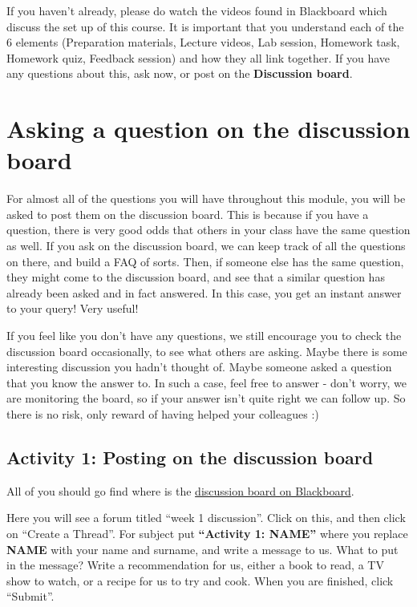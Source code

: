\documentclass[
]{book}
\begin{document}
If you haven't already, please do watch the videos found in Blackboard which discuss the set up of this course. It is important that you understand each of the 6 elements (Preparation materials, Lecture videos, Lab session, Homework task, Homework quiz, Feedback session) and how they all link together. If you have any questions about this, ask now, or post on the \textbf{Discussion board}.

\hypertarget{asking-a-question-on-the-discussion-board}{%
\section{Asking a question on the discussion board}\label{asking-a-question-on-the-discussion-board}}

For almost all of the questions you will have throughout this module, you will be asked to post them on the discussion board. This is because if you have a question, there is very good odds that others in your class have the same question as well. If you ask on the discussion board, we can keep track of all the questions on there, and build a FAQ of sorts. Then, if someone else has the same question, they might come to the discussion board, and see that a similar question has already been asked and in fact answered. In this case, you get an instant answer to your query! Very useful!

If you feel like you don't have any questions, we still encourage you to check the discussion board occasionally, to see what others are asking. Maybe there is some interesting discussion you hadn't thought of. Maybe someone asked a question that you know the answer to. In such a case, feel free to answer - don't worry, we are monitoring the board, so if your answer isn't quite right we can follow up. So there is no risk, only reward of having helped your colleagues :)

\hypertarget{activity-1-posting-on-the-discussion-board}{%
\subsection{Activity 1: Posting on the discussion board}\label{activity-1-posting-on-the-discussion-board}}

All of you should go find where is the \href{https://online.manchester.ac.uk/webapps/discussionboard/do/conference?toggle_mode=edit\&action=list_forums\&course_id=_67464_1\&nav=discussion_board_entry\&mode=cpview}{discussion board on Blackboard}.

Here you will see a forum titled ``week 1 discussion''. Click on this, and then click on ``Create a Thread''. For subject put \textbf{``Activity 1: NAME''} where you replace \textbf{NAME} with your name and surname, and write a message to us. What to put in the message? Write a recommendation for us, either a book to read, a TV show to watch, or a recipe for us to try and cook. When you are finished, click ``Submit''.
\end{document}
